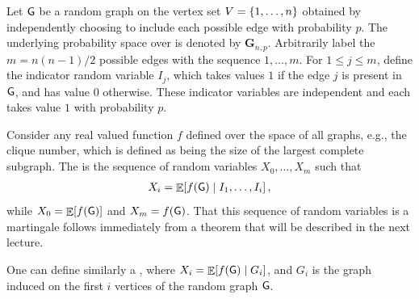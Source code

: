 \begin{example}
    Let $\mathsf{G}$ be a random graph on the vertex set
    $V = \left\{ {1,\ldots, n} \right\}$ obtained by independently choosing to
    include each possible edge with probability $p$. The underlying
    probability space over  is denoted by
    $\mathbf{G}_{n,p}$.  Arbitrarily label the $m = n (n-1)/2$
    possible edges with the sequence $1 ,\ldots, m$. For
    $ 1 \leq j \leq m$, define the indicator random variable $I_j$,
    which takes values $1$ if the edge $j$ is present in $\mathsf{G}$, and has
    value $0$ otherwise. These indicator variables are independent and
    each takes value $1$ with probability $p$.

    Consider any real valued function $f$ defined over the space of
    all graphs, e.g., the clique number, which is defined as being the
    size of the largest complete subgraph. The  is the sequence of random
    variables $X_0, \ldots, X_m$ such that
    \begin{align*}
      X_i = \mathop{\mathbb{E}}\!\left[  f(\mathsf{G}) \;\middle\vert\; I_1,\ldots, I_i \right],
    \end{align*}
    while $X_0 = \mathop{\mathbb{E}}\!\left[ {f(\mathsf{G})} \right]$ and $X_m = f(\mathsf{G})$.  That this sequence of
    random variables is a martingale follows immediately from a theorem
    that will be described in the next lecture.

    One can define similarly a , where $X_i = \mathop{\mathbb{E}}\!\left[ f(\mathsf{G}) \;\middle\vert\; G_i \right]$,
    and $G_i$ is the graph induced on the first $i$ vertices of the random graph
    $\mathsf{G}$.
\end{example}



